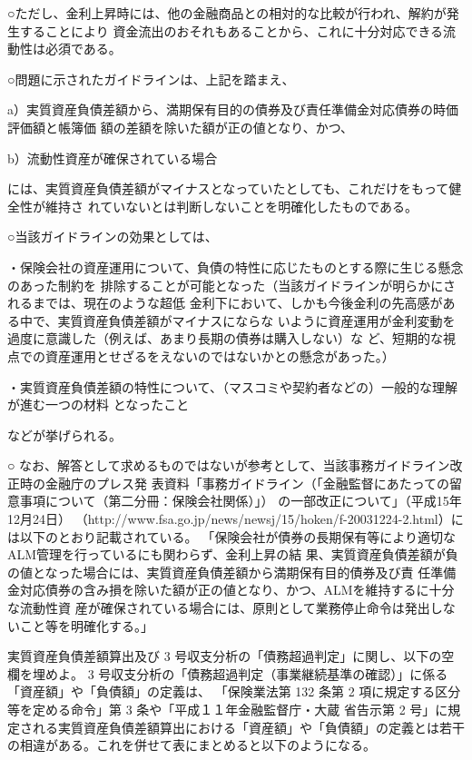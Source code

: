 \documentclass[report,gutter=10mm,fore-edge=10mm,uplatex,dvipdfmx]{jlreq}
\begin{document}
○ただし、金利上昇時には、他の金融商品との相対的な比較が行われ、解約が発生することにより
資金流出のおそれもあることから、これに十分対応できる流動性は必須である。

○問題に示されたガイドラインは、上記を踏まえ、

a）実質資産負債差額から、満期保有目的の債券及び責任準備金対応債券の時価評価額と帳簿価
額の差額を除いた額が正の値となり、かつ、

b）流動性資産が確保されている場合

には、実質資産負債差額がマイナスとなっていたとしても、これだけをもって健全性が維持さ
れていないとは判断しないことを明確化したものである。

○当該ガイドラインの効果としては、

・保険会社の資産運用について、負債の特性に応じたものとする際に生じる懸念のあった制約を
排除することが可能となった（当該ガイドラインが明らかにされるまでは、現在のような超低
金利下において、しかも今後金利の先高感がある中で、実質資産負債差額がマイナスにならな
いように資産運用が金利変動を過度に意識した（例えば、あまり長期の債券は購入しない）な
ど、短期的な視点での資産運用とせざるをえないのではないかとの懸念があった。）

・実質資産負債差額の特性について、（マスコミや契約者などの）一般的な理解が進む一つの材料
となったこと

などが挙げられる。

○
なお、解答として求めるものではないが参考として、当該事務ガイドライン改正時の金融庁のプレス発
表資料「事務ガイドライン（「金融監督にあたっての留意事項について（第二分冊：保険会社関係）」）
の一部改正について」（平成15年12月24日）
（http://www.fsa.go.jp/news/newsj/15/hoken/f-20031224-2.html）には以下のとおり記載されている。
「保険会社が債券の長期保有等により適切なALM管理を行っているにも関わらず、金利上昇の結
果、実質資産負債差額が負の値となった場合には、実質資産負債差額から満期保有目的債券及び責
任準備金対応債券の含み損を除いた額が正の値となり、かつ、ALMを維持するに十分な流動性資
産が確保されている場合には、原則として業務停止命令は発出しないこと等を明確化する。」


実質資産負債差額算出及び 3 号収支分析の「債務超過判定」に関し、以下の空欄を埋めよ。
3 号収支分析の「債務超過判定（事業継続基準の確認）」に係る「資産額」や「負債額」の定義は、
「保険業法第 132 条第 2 項に規定する区分等を定める命令」第 3 条や「平成１１年金融監督庁・大蔵
省告示第 2 号」に規定される実質資産負債差額算出における「資産額」や「負債額」の定義とは若干
の相違がある。これを併せて表にまとめると以下のようになる。
\end{document}
